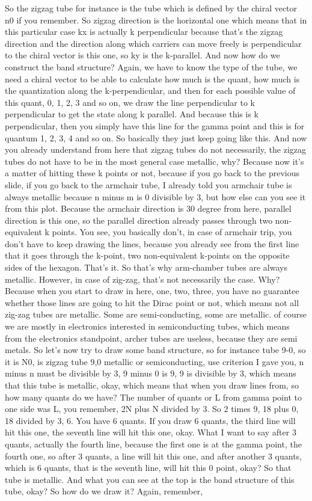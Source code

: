 So the zigzag tube for instance is the tube which is defined by the chiral vector n0 if you remember. So zigzag direction is the horizontal one which means that in this particular case kx is actually k perpendicular because that's the zigzag direction and the direction along which carriers can move freely is perpendicular to the chiral vector is this one, so ky is the k-parallel. And now how do we construct the band structure? Again, we have to know the type of the tube, we need a chiral vector to be able to calculate how much is the quant, how much is the quantization along the k-perpendicular, and then for each possible value of this quant, 0, 1, 2, 3 and so on, we draw the line perpendicular to k perpendicular to get the state along k parallel. And because this is k perpendicular, then you simply have this line for the gamma point and this is for quantum 1, 2, 3, 4 and so on. So basically they just keep going like this. And now you already understand from here that zigzag tubes do not necessarily, the zigzag tubes do not have to be in the most general case metallic, why? Because now it's a matter of hitting these k points or not, because if you go back to the previous slide, if you go back to the armchair tube, I already told you armchair tube is always metallic because n minus m is 0 divisible by 3, but how else can you see it from this plot. Because the armchair direction is 30 degree from here, parallel direction is this one, so the parallel direction already passes through two non-equivalent k points. You see, you basically don't, in case of armchair trip, you don't have to keep drawing the lines, because you already see from the first line that it goes through the k-point, two non-equivalent k-points on the opposite sides of the hexagon. That's it. So that's why arm-chamber tubes are always metallic. However, in case of zig-zag, that's not necessarily the case. Why? Because when you start to draw in here, one, two, three, you have no guarantee whether those lines are going to hit the Dirac point or not, which means not all zig-zag tubes are metallic. Some are semi-conducting, some are metallic. of course we are mostly in electronics interested in semiconducting tubes, which means from the electronics standpoint, archer tubes are useless, because they are semi metals. So let's now try to draw some band structure, so for instance tube 9-0, so it is N0, is zigzag tube 9,0 metallic or semiconducting, use criterion I gave you, n minus n must be divisible by 3, 9 minus 0 is 9, 9 is divisible by 3, which means that this tube is metallic, okay, which means that when you draw lines from, so how many quants do we have? The number of quants or L from gamma point to one side was L, you remember, 2N plus N divided by 3. So 2 times 9, 18 plus 0, 18 divided by 3, 6. You have 6 quants. If you draw 6 quants, the third line will hit this one, the seventh line will hit this one, okay. What I want to say after 3 quants, actually the fourth line, because the first one is at the gamma point, the fourth one, so after 3 quants, a line will hit this one, and after another 3 quants, which is 6 quants, that is the seventh line, will hit this 0 point, okay? So that tube is metallic. And what you can see at the top is the band structure of this tube, okay? So how do we draw it? Again, remember, 
